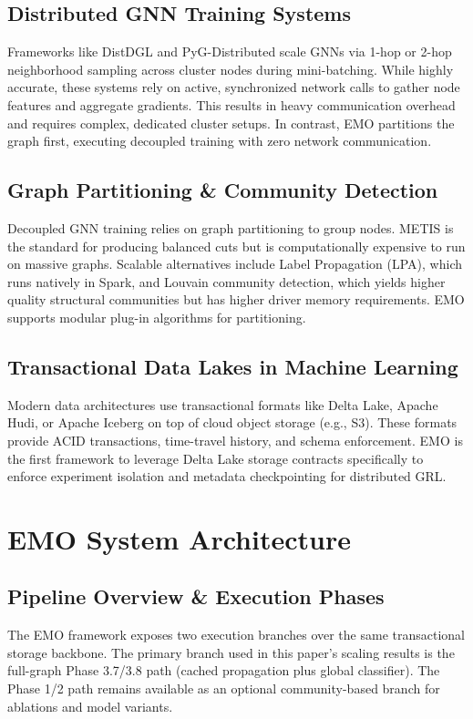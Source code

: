 \documentclass[conference,compsoc]{IEEEtran}
\begin{document}
\subsection{Distributed GNN Training Systems}
Frameworks like DistDGL and PyG-Distributed scale GNNs via 1-hop or 2-hop neighborhood sampling across cluster nodes during mini-batching. While highly accurate, these systems rely on active, synchronized network calls to gather node features and aggregate gradients. This results in heavy communication overhead and requires complex, dedicated cluster setups. In contrast, EMO partitions the graph first, executing decoupled training with zero network communication.

\subsection{Graph Partitioning \& Community Detection}
Decoupled GNN training relies on graph partitioning to group nodes. METIS is the standard for producing balanced cuts but is computationally expensive to run on massive graphs. Scalable alternatives include Label Propagation (LPA), which runs natively in Spark, and Louvain community detection, which yields higher quality structural communities but has higher driver memory requirements. EMO supports modular plug-in algorithms for partitioning.

\subsection{Transactional Data Lakes in Machine Learning}
Modern data architectures use transactional formats like Delta Lake, Apache Hudi, or Apache Iceberg on top of cloud object storage (e.g., S3). These formats provide ACID transactions, time-travel history, and schema enforcement. EMO is the first framework to leverage Delta Lake storage contracts specifically to enforce experiment isolation and metadata checkpointing for distributed GRL.

\section{EMO System Architecture}
\subsection{Pipeline Overview \& Execution Phases}
The EMO framework exposes two execution branches over the same transactional storage backbone. The primary branch used in this paper's scaling results is the full-graph Phase 3.7/3.8 path (cached propagation plus global classifier). The Phase 1/2 path remains available as an optional community-based branch for ablations and model variants.
\end{document}
